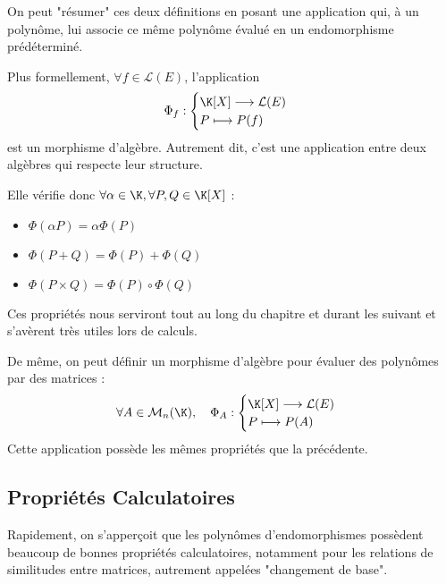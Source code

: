 \begin{proposition}
    On peut "résumer" ces deux définitions en posant une application qui, à un polynôme, lui associe ce même polynôme évalué 
    en un endomorphisme prédéterminé. 

    Plus formellement, $ \forall f \in \mathcal{L}(E)$, l'application 
        \[ \Phi_f : 
            \begin{cases}
                \K[X] \longrightarrow \mathcal{L}(E) \\ 
                P \longmapsto P(f)
            \end{cases}
        \]
    est un morphisme d'algèbre. Autrement dit, c'est une application entre deux algèbres qui respecte leur structure. 
    
    Elle vérifie donc $ \forall \alpha \in \K, \forall P,Q \in \K[X]$ :
    \begin{itemize}
        \item $\Phi(\alpha P) = \alpha \Phi(P)$ 
        \item $\Phi(P+Q) = \Phi(P) + \Phi(Q)$ 
        \item $\Phi(P \times Q) = \Phi(P) \circ \Phi(Q)$ 
    \end{itemize}
    Ces propriétés nous serviront tout au long du chapitre et durant les suivant et s'avèrent très utiles lors de calculs. 
\end{proposition}

\begin{remark}
    De même, on peut définir un morphisme d'algèbre pour évaluer des polynômes par des matrices :
        \[ \forall A \in \mathcal{M}_n(\K), \quad \Phi_A : 
            \begin{cases}
                \K[X] \longrightarrow \mathcal{L}(E) \\ 
                P \longmapsto P(A)
            \end{cases}
        \]
    Cette application possède les mêmes propriétés que la précédente. 
\end{remark}


\subsection{Propriétés Calculatoires}

Rapidement, on s'apperçoit que les polynômes d'endomorphismes possèdent beaucoup de bonnes propriétés calculatoires, 
notamment pour les relations de similitudes entre matrices, autrement appelées "changement de base". 

